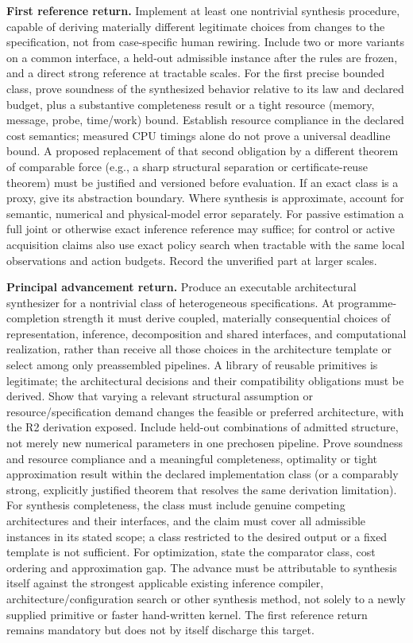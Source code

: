 \documentclass[11pt,letterpaper]{article}
\begin{document}
\textbf{First reference return.} Implement at least one nontrivial synthesis procedure, capable of deriving materially different legitimate choices from changes to the specification, not from case-specific human rewiring. Include two or more variants on a common interface, a held-out admissible instance after the rules are frozen, and a direct strong reference at tractable scales. For the first precise bounded class, prove soundness of the synthesized behavior relative to its law and declared budget, plus a substantive completeness result or a tight resource (memory, message, probe, time/work) bound. Establish resource compliance in the declared cost semantics; measured CPU timings alone do not prove a universal deadline bound. A proposed replacement of that second obligation by a different theorem of comparable force (e.g., a sharp structural separation or certificate-reuse theorem) must be justified and versioned before evaluation. If an exact class is a proxy, give its abstraction boundary. Where synthesis is approximate, account for semantic, numerical and physical-model error separately. For passive estimation a full joint or otherwise exact inference reference may suffice; for control or active acquisition claims also use exact policy search when tractable with the same local observations and action budgets. Record the unverified part at larger scales.

\textbf{Principal advancement return.} Produce an executable architectural synthesizer for a nontrivial class of heterogeneous specifications. At programme-completion strength it must derive coupled, materially consequential choices of representation, inference, decomposition and shared interfaces, and computational realization, rather than receive all those choices in the architecture template or select among only preassembled pipelines. A library of reusable primitives is legitimate; the architectural decisions and their compatibility obligations must be derived. Show that varying a relevant structural assumption or resource/specification demand changes the feasible or preferred architecture, with the R2 derivation exposed. Include held-out combinations of admitted structure, not merely new numerical parameters in one prechosen pipeline. Prove soundness and resource compliance and a meaningful completeness, optimality or tight approximation result within the declared implementation class (or a comparably strong, explicitly justified theorem that resolves the same derivation limitation). For synthesis completeness, the class must include genuine competing architectures and their interfaces, and the claim must cover all admissible instances in its stated scope; a class restricted to the desired output or a fixed template is not sufficient. For optimization, state the comparator class, cost ordering and approximation gap. The advance must be attributable to synthesis itself against the strongest applicable existing inference compiler, architecture/configuration search or other synthesis method, not solely to a newly supplied primitive or faster hand-written kernel. The first reference return remains mandatory but does not by itself discharge this target.
\end{document}
